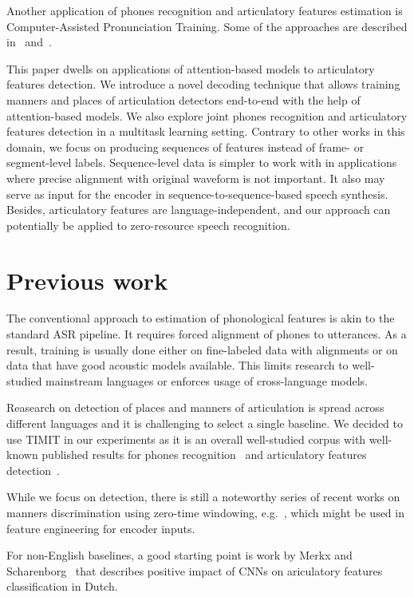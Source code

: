 \documentclass[a4paper]{article}
\begin{document}
Another application of phones recognition and articulatory features estimation is Computer-Assisted Pronunciation Training. Some of the approaches are described in~\cite{Eskenazi-2009} and~\cite{Ryu2017}.

This paper dwells on applications of attention-based models to articulatory features detection. We introduce a novel decoding technique that allows training manners and places of articulation detectors end-to-end with the help of attention-based models. We also explore joint phones recognition and articulatory features detection in a multitask learning setting. Contrary to other works in this domain, we focus on producing sequences of features instead of frame- or segment-level labels. Sequence-level data is simpler to work with in applications where precise alignment with original waveform is not important. It also may serve as input for the encoder in sequence-to-sequence-based speech synthesis. Besides, articulatory features are language-independent, and our approach can potentially be applied to zero-resource speech recognition.

\section{Previous work}
The conventional approach to estimation of phonological features is akin to the standard ASR pipeline. It requires forced alignment of phones to utterances. As a result, training is usually done either on fine-labeled data with alignments or on data that have good acoustic models available. This limits research to well-studied mainstream languages or enforces usage of cross-language models.

Reasearch on detection of places and manners of articulation is spread across different languages and it is challenging to select a single baseline. We decided to use TIMIT in our experiments as it is an overall well-studied corpus with well-known published results for phones recognition~\cite{Graves2013} and articulatory features detection~\cite{King-2000}.

While we focus on detection, there is still a noteworthy series of recent works on manners discrimination using zero-time windowing, e.g.~\cite{Prasad-2018}, which might be used in feature engineering for encoder inputs.

For non-English baselines, a good starting point is work by Merkx and Scharenborg~\cite{Merkx-IS2018} that describes positive impact of CNNs on ariculatory features classification in Dutch.
\end{document}
